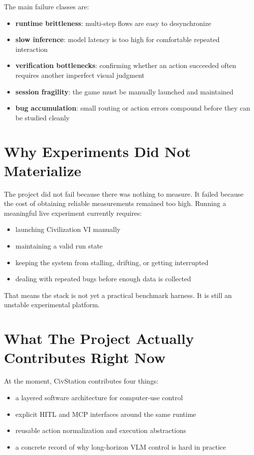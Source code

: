 \documentclass[11pt]{article}
\begin{document}
The main failure classes are:
\begin{itemize}[leftmargin=*]
    \item \textbf{runtime brittleness}: multi-step flows are easy to desynchronize
    \item \textbf{slow inference}: model latency is too high for comfortable repeated interaction
    \item \textbf{verification bottlenecks}: confirming whether an action succeeded often requires another imperfect visual judgment
    \item \textbf{session fragility}: the game must be manually launched and maintained
    \item \textbf{bug accumulation}: small routing or action errors compound before they can be studied cleanly
\end{itemize}

\section{Why Experiments Did Not Materialize}

The project did not fail because there was nothing to measure. It failed because the cost of obtaining reliable measurements remained too high. Running a meaningful live experiment currently requires:
\begin{itemize}[leftmargin=*]
    \item launching Civilization VI manually
    \item maintaining a valid run state
    \item keeping the system from stalling, drifting, or getting interrupted
    \item dealing with repeated bugs before enough data is collected
\end{itemize}

That means the stack is not yet a practical benchmark harness. It is still an unstable experimental platform.

\section{What The Project Actually Contributes Right Now}

At the moment, CivStation contributes four things:
\begin{itemize}[leftmargin=*]
    \item a layered software architecture for computer-use control
    \item explicit HITL and MCP interfaces around the same runtime
    \item reusable action normalization and execution abstractions
    \item a concrete record of why long-horizon VLM control is hard in practice
\end{itemize}
\end{document}
